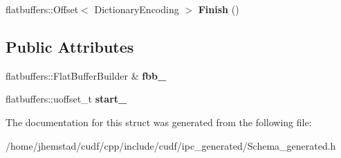 \begin{DoxyCompactItemize}
\item 
flatbuffers\+::\+Offset$<$ Dictionary\+Encoding $>$ {\bfseries Finish} ()\hypertarget{structorg_1_1apache_1_1arrow_1_1flatbuf_1_1DictionaryEncodingBuilder_a773d3c0eab4c34ca9437183c252d7b74}{}\label{structorg_1_1apache_1_1arrow_1_1flatbuf_1_1DictionaryEncodingBuilder_a773d3c0eab4c34ca9437183c252d7b74}

\end{DoxyCompactItemize}
\subsection*{Public Attributes}
\begin{DoxyCompactItemize}
\item 
flatbuffers\+::\+Flat\+Buffer\+Builder \& {\bfseries fbb\+\_\+}\hypertarget{structorg_1_1apache_1_1arrow_1_1flatbuf_1_1DictionaryEncodingBuilder_acf7ccf233e0cd1f44c8d2740bfe17878}{}\label{structorg_1_1apache_1_1arrow_1_1flatbuf_1_1DictionaryEncodingBuilder_acf7ccf233e0cd1f44c8d2740bfe17878}

\item 
flatbuffers\+::uoffset\+\_\+t {\bfseries start\+\_\+}\hypertarget{structorg_1_1apache_1_1arrow_1_1flatbuf_1_1DictionaryEncodingBuilder_a721294db8c04e1cd518972d317ddf1d4}{}\label{structorg_1_1apache_1_1arrow_1_1flatbuf_1_1DictionaryEncodingBuilder_a721294db8c04e1cd518972d317ddf1d4}

\end{DoxyCompactItemize}


The documentation for this struct was generated from the following file\+:\begin{DoxyCompactItemize}
\item 
/home/jhemstad/cudf/cpp/include/cudf/ipc\+\_\+generated/Schema\+\_\+generated.\+h\end{DoxyCompactItemize}
